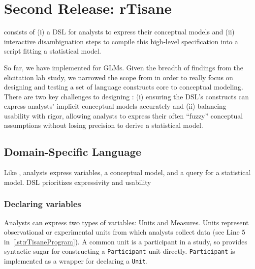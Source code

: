 \clearpage %
\rTisaneProgram
\section{Second Release: rTisane} \label{sec:rTisane}

\rTisane consists of (i) a DSL for analysts to express their conceptual
models and (ii) interactive disambiguation steps to compile this high-level specification into a
script fitting a statistical model. 

So far, we have implemented \rTisane for GLMs. Given the breadth of findings
from the elicitation lab study, we narrowed the scope from \tisane in order to
really focus on designing and testing a set of language constructs core to
conceptual modeling. 
There are two key challenges to designing \rTisane: (i) ensuring the DSL's
constructs can express analysts' implicit conceptual models accurately and (ii) %
balancing usability with rigor, allowing
analysts to express their often ``fuzzy'' conceptual assumptions without losing
precision to derive a statistical model.

\def\Participant{\texttt{Participant}\xspace}
\def\Unit{\texttt{Unit}\xspace}
\def\Condition{\texttt{Condition}\xspace}
\def\Conditions{\texttt{Condition}s\xspace}

\subsection{\rTisanes Domain-Specific Language}
Like \tisane, analysts express variables, a conceptual model, and a query for a
statistical model. \rTisanes DSL prioritizes expressivity and usability 

\subsubsection{Declaring variables}
Analysts can express two types of variables: Units and Measures. Units represent
observational or experimental units from which analysts collect data (see Line 5 in~\autoref{lst:rTisaneProgram}). 
A common unit is a participant in a study, so \rTisane provides syntactic sugar for
constructing a \Participant unit directly. \Participant is implemented as a wrapper for
declaring a \Unit.

